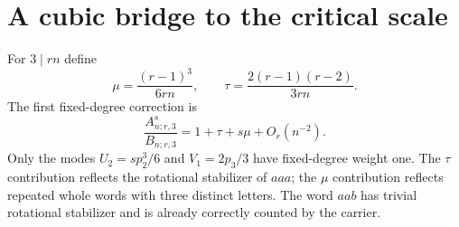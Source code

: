 \documentclass[11pt]{article}
\theoremstyle{definition}\newtheorem{definition}[theorem]{Definition}
\theoremstyle{remark}\newtheorem{remark}[theorem]{Remark}
\numberwithin{equation}{section}
\begin{document}
\section{A cubic bridge to the critical scale}\label{rcw:sec:bridge}
For $3\mid rn$ define
\begin{equation}\label{rcw:eq:mutau}
 \mu=\frac{(r-1)^3}{6rn},\qquad
 \tau=\frac{2(r-1)(r-2)}{3rn}.
\end{equation}
The first fixed-degree correction is
\begin{equation}\label{rcw:eq:firstgeneral}
 \frac{A^s_{n;r,3}}{B_{n;r,3}}=1+\tau+s\mu+O_r(n^{-2}).
\end{equation}
Only the modes $U_2=s p_2^3/6$ and $V_1=2p_3/3$ have fixed-degree weight one. The $\tau$ contribution reflects the rotational stabilizer of $aaa$; the $\mu$ contribution reflects repeated whole words with three distinct letters. The word $aab$ has trivial rotational stabilizer and is already correctly counted by the carrier.
\end{document}
